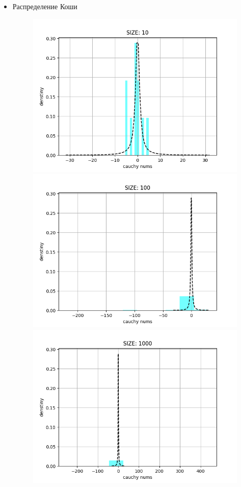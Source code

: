\begin{itemize}
	\item{Распределение Коши}
	\begin{figure}[H]
		\begin{center}
			\includegraphics[scale=0.5]{resources/cauchy10.png}
			\includegraphics[scale=0.5]{resources/cauchy100.png}
			\includegraphics[scale=0.75]{resources/cauchy1000.png}

\end{center}
\end{figure}
\end{itemize}
